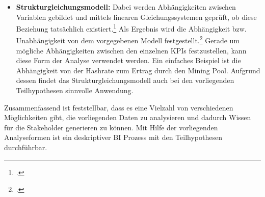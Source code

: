 \begin{itemize}
\begin{itemize}
        messen und dadurch bestimmen, ob eine Trennung existiert und wie stark diese
        ist.\footcite[Vgl.][S. 98]{bihani2014comparative} Die Anwendung dieser Analyse liegt klassischerweise im Verständnis
        von demographischen Faktoren beim Kauf von Produkten.\footcite[Vgl.][S. 98]{bihani2014comparative} Interessant ist diese
        Form der Analyse für die Interpretation der identischen \acp{KPI} aus verschiedenen Rechenzentren. Gerade die Analyse von
        Unterschieden von Daten zwischen Rechenzentren ermöglicht die Generierung von neuem Wissen und ist somit im Bereich
        \ac{BI} von unmittelbarer Relevanz. Die Anwendung der Diskriminanzfunktionsanalyse ist daher für alle Teilhypothesen
        sinnvoll, sobald mehr als ein Rechenzentrum betrachtet wird.
        \item \textbf{Strukturgleichungsmodell: }Dabei werden Abhängigkeiten zwischen Variablen gebildet und mittels linearen
        Gleichungssystemen geprüft, ob diese Beziehung tatsächlich existiert.\footcite[Vgl.][S. 98f]{bihani2014comparative} Als
        Ergebnis wird die Abhängigkeit bzw. Unabhängigkeit von dem vorgegebenen Modell
        festgestellt.\footcite[Vgl.][S. 98f]{bihani2014comparative}
        Gerade um mögliche Abhängigkeiten zwischen den einzelnen \acp{KPI} festzustellen, kann diese Form der Analyse verwendet
        werden. Ein einfaches Beispiel ist die Abhängigkeit von der Hashrate zum Ertrag durch den Mining Pool. Aufgrund dessen
        findet das Strukturgleichungsmodell auch bei den vorliegenden Teilhypothesen sinnvolle Anwendung.
    \end{itemize}
    Zusammenfassend ist feststellbar, dass es eine Vielzahl von verschiedenen Möglichkeiten gibt, die vorliegenden Daten zu
    analysieren und dadurch Wissen für die Stakeholder generieren zu können. Mit Hilfe der vorliegenden Analyseformen ist
    ein deskriptiver \ac{BI} Prozess mit den Teilhypothesen durchführbar.


\end{itemize}
